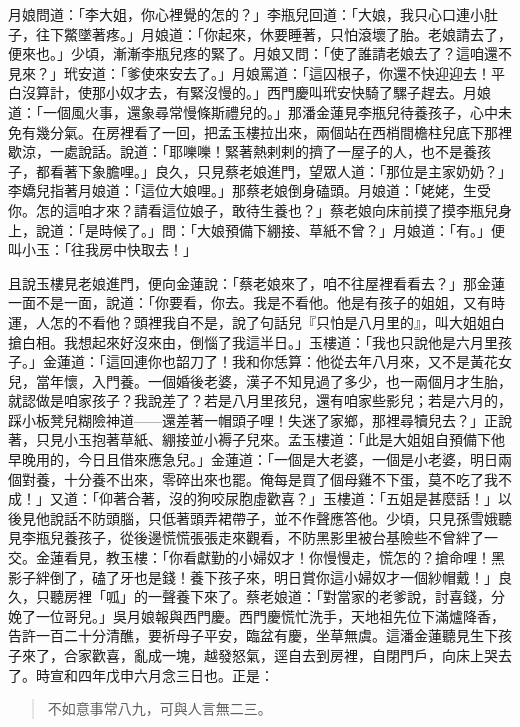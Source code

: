 月娘問道：「李大姐，你心裡覺的怎的？」李瓶兒回道：「大娘，我只心口連小肚子，往下鱉墜著疼。」月娘道：「你起來，休要睡著，只怕滾壞了胎。老娘請去了，便來也。」少頃，漸漸李瓶兒疼的緊了。月娘又問：「使了誰請老娘去了？這咱還不見來？」玳安道：「爹使來安去了。」月娘罵道：「這囚根子，你還不快迎迎去！平白沒算計，使那小奴才去，有緊沒慢的。」西門慶叫玳安快騎了騾子趕去。月娘道：「一個風火事，還象尋常慢條斯禮兒的。」那潘金蓮見李瓶兒待養孩子，心中未免有幾分氣。在房裡看了一回，把孟玉樓拉出來，兩個站在西梢間檐柱兒底下那裡歇涼，一處說話。說道：「耶嚛嚛！緊著熱剌剌的擠了一屋子的人，也不是養孩子，都看著下象膽哩。」良久，只見蔡老娘進門，望眾人道：「那位是主家奶奶？」李嬌兒指著月娘道：「這位大娘哩。」那蔡老娘倒身磕頭。月娘道：「姥姥，生受你。怎的這咱才來？請看這位娘子，敢待生養也？」蔡老娘向床前摸了摸李瓶兒身上，說道：「是時候了。」問：「大娘預備下綳接、草紙不曾？」月娘道：「有。」便叫小玉：「往我房中快取去！」

且說玉樓見老娘進門，便向金蓮說：「蔡老娘來了，咱不往屋裡看看去？」那金蓮一面不是一面，說道：「你要看，你去。我是不看他。他是有孩子的姐姐，又有時運，人怎的不看他？頭裡我自不是，說了句話兒『只怕是八月里的』，叫大姐姐白搶白相。我想起來好沒來由，倒惱了我這半日。」玉樓道：「我也只說他是六月里孩子。」金蓮道：「這回連你也韶刀了！我和你恁算：他從去年八月來，又不是黃花女兒，當年懷，入門養。一個婚後老婆，漢子不知見過了多少，也一兩個月才生胎，就認做是咱家孩子？我說差了？若是八月里孩兒，還有咱家些影兒；若是六月的，踩小板凳兒糊險神道——還差著一帽頭子哩！失迷了家鄉，那裡尋犢兒去？」正說著，只見小玉抱著草紙、綳接並小褥子兒來。孟玉樓道：「此是大姐姐自預備下他早晚用的，今日且借來應急兒。」金蓮道：「一個是大老婆，一個是小老婆，明日兩個對養，十分養不出來，零碎出來也罷。俺每是買了個母雞不下蛋，莫不吃了我不成！」又道：「仰著合著，沒的狗咬尿胞虛歡喜？」玉樓道：「五姐是甚麼話！」以後見他說話不防頭腦，只低著頭弄裙帶子，並不作聲應答他。少頃，只見孫雪娥聽見李瓶兒養孩子，從後邊慌慌張張走來觀看，不防黑影里被台基險些不曾絆了一交。金蓮看見，教玉樓：「你看獻勤的小婦奴才！你慢慢走，慌怎的？搶命哩！黑影子絆倒了，磕了牙也是錢！養下孩子來，明日賞你這小婦奴才一個紗帽戴！」良久，只聽房裡「呱」的一聲養下來了。蔡老娘道：「對當家的老爹說，討喜錢，分娩了一位哥兒。」吳月娘報與西門慶。西門慶慌忙洗手，天地祖先位下滿爐降香，告許一百二十分清醮，要祈母子平安，臨盆有慶，坐草無虞。這潘金蓮聽見生下孩子來了，合家歡喜，亂成一塊，越發怒氣，逕自去到房裡，自閉門戶，向床上哭去了。時宣和四年戊申六月念三日也。正是：
\begin{quote}
不如意事常八九，可與人言無二三。
\end{quote}

